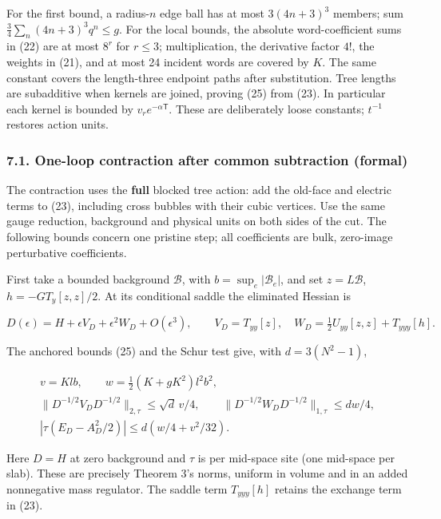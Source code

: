 \documentclass[11pt,a4paper]{article}
\begin{document}
For the first bound, a radius-\(n\) edge ball has at most \(3(4n+3)^3\)
members; sum \(\frac34\sum_n(4n+3)^3q^n\le g\). For the local bounds,
the absolute word-coefficient sums in (22) are at most \(8^r\) for
\(r\le3\); multiplication, the derivative factor \(4!\), the weights in
(21), and at most 24 incident words are covered by \(K\). The same
constant covers the length-three endpoint paths after substitution. Tree
lengths are subadditive when kernels are joined, proving (25) from (23).
In particular each kernel is bounded by \(v_r e^{-\alpha\mathsf T}\).
These are deliberately loose constants; \(t^{-1}\) restores action
units.

\hypertarget{one-loop-contraction-after-common-subtraction-formal}{%
\subsubsection{7.1. One-loop contraction after common subtraction
(formal)}\label{one-loop-contraction-after-common-subtraction-formal}}

The contraction uses the \textbf{full} blocked tree action: add the
old-face and electric terms to (23), including cross bubbles with their
cubic vertices. Use the same gauge reduction, background and physical
units on both sides of the cut. The following bounds concern one
pristine step; all coefficients are bulk, zero-image perturbative
coefficients.

First take a bounded background \(\mathcal B\), with
\(b=\sup_e|\mathcal B_e|\), and set \(z=L\mathcal B\),
\(h=-GT_y[z,z]/2\). At its conditional saddle the eliminated Hessian is

\[D(\epsilon)=H+\epsilon V_D+\epsilon^2W_D+O(\epsilon^3),\qquad
 V_D=T_{yy}[z],\quad W_D=\tfrac12U_{yy}[z,z]+T_{yyy}[h]. \tag{26}\]

The anchored bounds (25) and the Schur test give, with \(d=3(N^2-1)\),

\[\begin{gathered}
 v=Kl b,\qquad w=\tfrac12(K+gK^2)l^2b^2,\\
 \|D^{-1/2}V_DD^{-1/2}\|_{2,\tau}\le\sqrt d\,v/4,\qquad
 \|D^{-1/2}W_DD^{-1/2}\|_{1,\tau}\le d w/4,\\
 |\tau(E_D-A_D^2/2)|\le d(w/4+v^2/32). \tag{27}
\end{gathered}\]

Here \(D=H\) at zero background and \(\tau\) is per mid-space site (one
mid-space per slab). These are precisely Theorem 3's norms, uniform in
volume and in an added nonnegative mass regulator. The saddle term
\(T_{yyy}[h]\) retains the exchange term in (23).
\end{document}
